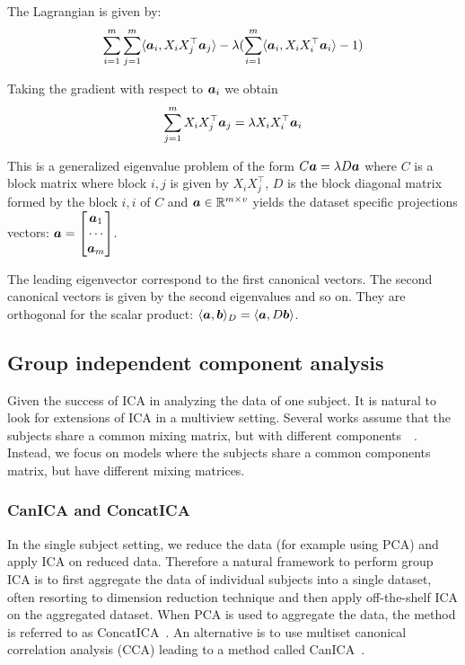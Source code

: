 The Lagrangian is given by:
\begin{align}
  \sum_{i=1}^m \sum_{j=1}^m \langle{ \boldsymbol{a}_i },{ X_i X_j^{\top} \boldsymbol{a}_j }\rangle - \lambda (\sum_{i=1}^m
  \langle{ \boldsymbol{a}_i },{X_i X_i^{\top} \boldsymbol{a}_i }\rangle - 1)
\end{align}

Taking the gradient with respect to $\boldsymbol{a}_i$ we obtain
\begin{align}
  \sum_{j=1}^m X_i X_j^{\top} \boldsymbol{a}_j = \lambda X_i X_i^{\top} \boldsymbol{a}_i
\end{align}

This is a generalized eigenvalue problem of the form $C \boldsymbol{a} = \lambda D \boldsymbol{a}$
where $C$ is a block matrix where block $i,j$ is given by $X_i X_j^{\top}$, 
$D$ is the block diagonal matrix formed by the block $i, i$ of $C$ and $\boldsymbol{a} \in
\mathbb{R}^{m \times v}$ yields the dataset specific projections vectors: $\boldsymbol{a} = \begin{bmatrix} \boldsymbol{a}_1 \\ \cdots \\
  \boldsymbol{a}_m \end{bmatrix}$.

    The leading eigenvector correspond to the first canonical vectors. The
    second canonical vectors is given by the second eigenvalues and so on. They
    are orthogonal for the scalar product: $\langle{ \boldsymbol{a}},{ \boldsymbol{b}  }\rangle_D =
    \langle{ \boldsymbol{a}},{ D \boldsymbol{b}  }\rangle$.

  
\subsection{Group independent component analysis}
\label{sec:groupica}
Given the success of ICA in analyzing the data of one subject. It is natural to
look for extensions of ICA in a multiview setting.
Several works assume that the subjects share a common mixing matrix, but with different components~\cite{pfister2019robustifying}~\cite{svensen2002ica}.
% 
Instead, we focus on models where the subjects share a common components matrix, but have different mixing matrices.

\subsubsection{CanICA and ConcatICA}
\label{sec:canicaandconcatica}
In the single subject setting, we reduce the data (for example using PCA) and apply ICA on
reduced data. Therefore a natural framework to perform group ICA is to first aggregate the
data of individual subjects into a single dataset, often resorting to dimension
reduction technique and then apply off-the-shelf ICA on the aggregated dataset.
When PCA is used to aggregate the data, the method is referred to as
ConcatICA~\cite{calhoun2001method}. An alternative is to use multiset canonical
correlation analysis (CCA) leading to a method called CanICA~\cite{varoquaux2009canica}.

